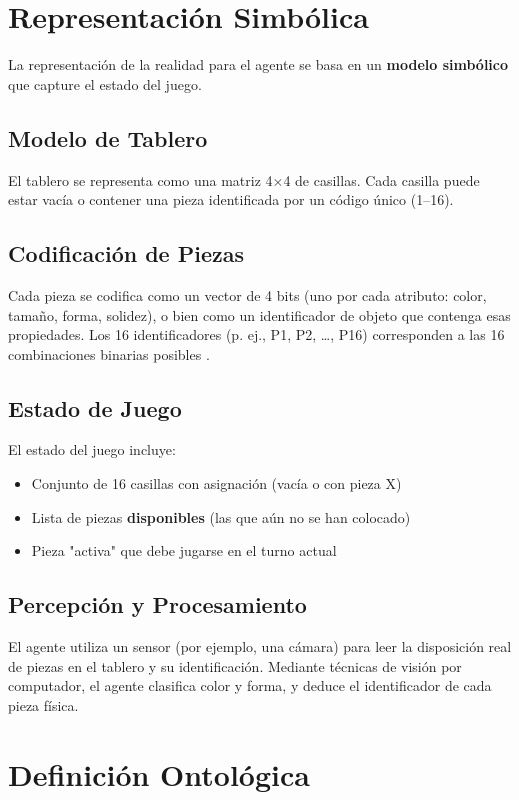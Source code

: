 \documentclass[conference]{IEEEtran}
\begin{document}
\section{Representación Simbólica}

La representación de la realidad para el agente se basa en un \textbf{modelo simbólico} que capture el estado del juego.

\subsection{Modelo de Tablero}
El tablero se representa como una matriz 4×4 de casillas. Cada casilla puede estar vacía o contener una pieza identificada por un código único (1–16).

\subsection{Codificación de Piezas}
Cada pieza se codifica como un vector de 4 bits (uno por cada atributo: color, tamaño, forma, solidez), o bien como un identificador de objeto que contenga esas propiedades. Los 16 identificadores (p. ej., P1, P2, …, P16) corresponden a las 16 combinaciones binarias posibles \cite{muller2009}.

\subsection{Estado de Juego}
El estado del juego incluye:
\begin{itemize}
\item Conjunto de 16 casillas con asignación (vacía o con pieza X)
\item Lista de piezas \textbf{disponibles} (las que aún no se han colocado)
\item Pieza "activa" que debe jugarse en el turno actual
\end{itemize}

\subsection{Percepción y Procesamiento}
El agente utiliza un sensor (por ejemplo, una cámara) para leer la disposición real de piezas en el tablero y su identificación. Mediante técnicas de visión por computador, el agente clasifica color y forma, y deduce el identificador de cada pieza física.

\section{Definición Ontológica}
\end{document}
